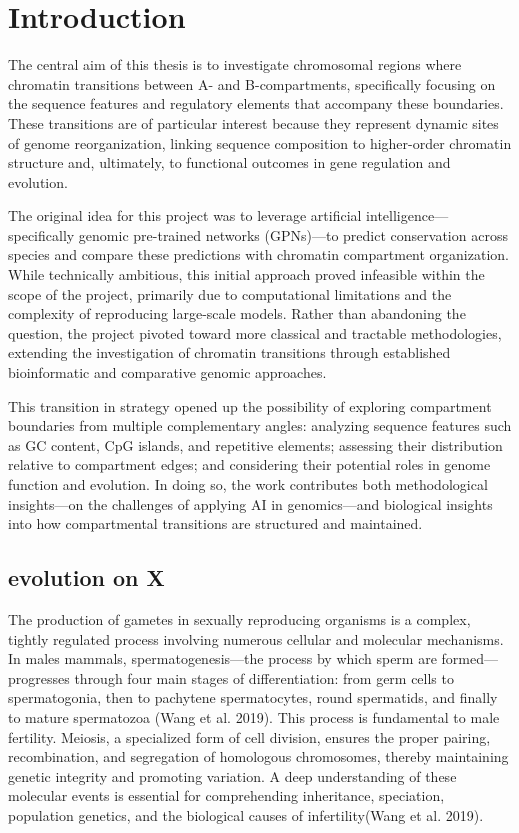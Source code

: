 \documentclass[
  a4paper,
  openany]{scrbook}
\renewcommand*\contentsname{Table of contents}
\newcommand\contentsname{Table of contents}
\begin{document}
\renewcommand*\contentsname{Table of contents}
{
\setcounter{tocdepth}{1}
\tableofcontents
}

\mainmatter
\chapter{Introduction}\label{introduction}

The central aim of this thesis is to investigate chromosomal regions
where chromatin transitions between A- and B-compartments, specifically
focusing on the sequence features and regulatory elements that accompany
these boundaries. These transitions are of particular interest because
they represent dynamic sites of genome reorganization, linking sequence
composition to higher-order chromatin structure and, ultimately, to
functional outcomes in gene regulation and evolution.

The original idea for this project was to leverage artificial
intelligence---specifically genomic pre-trained networks (GPNs)---to
predict conservation across species and compare these predictions with
chromatin compartment organization. While technically ambitious, this
initial approach proved infeasible within the scope of the project,
primarily due to computational limitations and the complexity of
reproducing large-scale models. Rather than abandoning the question, the
project pivoted toward more classical and tractable methodologies,
extending the investigation of chromatin transitions through established
bioinformatic and comparative genomic approaches.

This transition in strategy opened up the possibility of exploring
compartment boundaries from multiple complementary angles: analyzing
sequence features such as GC content, CpG islands, and repetitive
elements; assessing their distribution relative to compartment edges;
and considering their potential roles in genome function and evolution.
In doing so, the work contributes both methodological insights---on the
challenges of applying AI in genomics---and biological insights into how
compartmental transitions are structured and maintained.

\section{evolution on X}\label{evolution-on-x}

The production of gametes in sexually reproducing organisms is a
complex, tightly regulated process involving numerous cellular and
molecular mechanisms. In males mammals, spermatogenesis---the process by
which sperm are formed---progresses through four main stages of
differentiation: from germ cells to spermatogonia, then to pachytene
spermatocytes, round spermatids, and finally to mature spermatozoa (Wang
et al. 2019). This process is fundamental to male fertility. Meiosis, a
specialized form of cell division, ensures the proper pairing,
recombination, and segregation of homologous chromosomes, thereby
maintaining genetic integrity and promoting variation. A deep
understanding of these molecular events is essential for comprehending
inheritance, speciation, population genetics, and the biological causes
of infertility(Wang et al. 2019).
\end{document}
